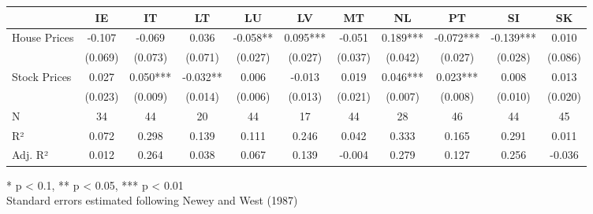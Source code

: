 \documentclass[
  a4paper,
  DIV=11,
  numbers=noendperiod]{scrartcl}
\begin{document}
\begin{landscape}
\begin{table}[h]
\fontsize{7.5pt}{9.0pt}\selectfont
\begin{tabular*}{\linewidth}{@{\extracolsep{\fill}}lcccccccccc}
\toprule
  & IE & IT & LT & LU & LV & MT & NL & PT & SI & SK \\ 
\midrule\addlinespace[2.5pt]
House Prices & -0.107 & -0.069 & 0.036 & -0.058** & 0.095*** & -0.051 & 0.189*** & -0.072*** & -0.139*** & 0.010 \\ 
 & (0.069) & (0.073) & (0.071) & (0.027) & (0.027) & (0.037) & (0.042) & (0.027) & (0.028) & (0.086) \\ 
Stock Prices & 0.027 & 0.050*** & -0.032** & 0.006 & -0.013 & 0.019 & 0.046*** & 0.023*** & 0.008 & 0.013 \\ 
{} & {(0.023)} & {(0.009)} & {(0.014)} & {(0.006)} & {(0.013)} & {(0.021)} & {(0.007)} & {(0.008)} & {(0.010)} & {(0.020)} \\ 
N & 34 & 44 & 20 & 44 & 17 & 44 & 28 & 46 & 44 & 45 \\ 
R² & 0.072 & 0.298 & 0.139 & 0.111 & 0.246 & 0.042 & 0.333 & 0.165 & 0.291 & 0.011 \\ 
Adj. R² & 0.012 & 0.264 & 0.038 & 0.067 & 0.139 & -0.004 & 0.279 & 0.127 & 0.256 & -0.036 \\ 
\bottomrule
\end{tabular*}
\begin{minipage}{\linewidth}
* p < 0.1, ** p < 0.05, *** p < 0.01\\
Standard errors estimated following Newey and West (1987)\\
\end{minipage}
\end{table}




\end{landscape}

\newpage{}
\end{document}
